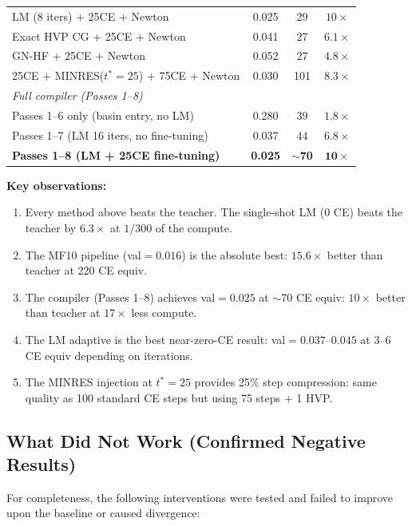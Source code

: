 \documentclass[11pt]{amsart}
\begin{document}
\begin{center}
\begin{tabular}{p{6.8cm}ccc}
LM (8 iters) + 25CE + Newton & 0.025 & 29 & $10\times$ \\
Exact HVP CG + 25CE + Newton & 0.041 & 27 & $6.1\times$ \\
GN-HF + 25CE + Newton & 0.052 & 27 & $4.8\times$ \\
25CE + MINRES($t^*{=}25$) + 75CE + Newton & 0.030 & 101 & $8.3\times$ \\
\midrule
\multicolumn{4}{l}{\textit{Full compiler (Passes 1--8)}} \\
Passes 1--6 only (basin entry, no LM) & 0.280 & 39 & $1.8\times$ \\
Passes 1--7 (LM 16 iters, no fine-tuning) & 0.037 & 44 & $6.8\times$ \\
\textbf{Passes 1--8 (LM + 25CE fine-tuning)} & \textbf{0.025} & \textbf{$\sim$70} & $\mathbf{10\times}$ \\
\bottomrule
\end{tabular}
\end{center}

\noindent
\textbf{Key observations:}
\begin{enumerate}
\item Every method above beats the teacher. The single-shot LM (0 CE)
  beats the teacher by $6.3\times$ at $1/300$ of the compute.
\item The MF10 pipeline (val${=}0.016$) is the absolute best:
  $15.6\times$ better than teacher at 220 CE equiv.
\item The compiler (Passes 1--8) achieves val${=}0.025$ at $\sim$70 CE equiv:
  $10\times$ better than teacher at $17\times$ less compute.
\item The LM adaptive is the best near-zero-CE result:
  val${=}0.037$--$0.045$ at 3--6 CE equiv depending on iterations.
\item The MINRES injection at $t^*{=}25$ provides 25\% step compression:
  same quality as 100 standard CE steps but using 75 steps + 1 HVP.
\end{enumerate}

\subsection{What Did Not Work (Confirmed Negative Results)}

For completeness, the following interventions were tested and failed to improve upon the baseline or caused divergence:
\end{document}
